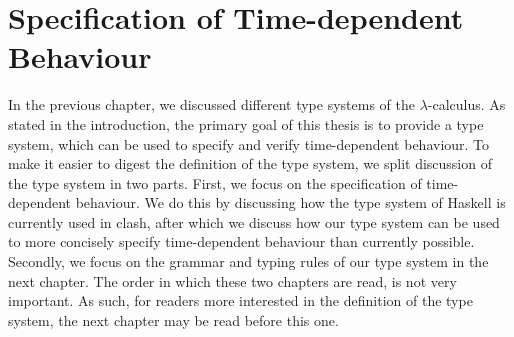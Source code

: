 \newcommand{\framedhslinecorrect}[2]%
  {#1[#2]}

\newcommand{\framedhs}{\sethscode{framedhscode}}


\newenvironment{inlinehscode}%
  {\(\def\column##1##2{}%
   \let\>\undefined\let\<\undefined\let\\\undefined
   \newcommand\>[1][]{}\newcommand\<[1][]{}\newcommand\\[1][]{}%
   \def\fromto##1##2##3{##3}%
   \def\nextline{}}{\) }%

\newcommand{\inlinehs}{\sethscode{inlinehscode}}


\newenvironment{joincode}%
  {\let\orighscode=\hscode
   \let\origendhscode=\endhscode
   \def\endhscode{\def\hscode{\endgroup\def\@currenvir{hscode}\\}\begingroup}
   \orighscode\def\hscode{\endgroup\def\@currenvir{hscode}}}%
  {\origendhscode
   \global\let\hscode=\orighscode
   \global\let\endhscode=\origendhscode}%

\makeatother
\EndFmtInput
%

\chapter{Specification of Time-dependent Behaviour} \label{ch:specification}
In the previous chapter, we discussed different type systems of the $\lambda$-calculus.
As stated in the introduction, the primary goal of this thesis is to provide a type system, which can be used to specify and verify time-dependent behaviour.
To make it easier to digest the definition of the type system, we split discussion of the type system in two parts.
First, we focus on the specification of time-dependent behaviour.
We do this by discussing how the type system of Haskell is currently used in \gls{clash}, after which we discuss how our type system can be used to more concisely specify time-dependent behaviour than currently possible.
Secondly, we focus on the grammar and typing rules of our type system in the next chapter.
The order in which these two chapters are read, is not very important.
As such, for readers more interested in the definition of the type system, the next chapter may be read before this one.

